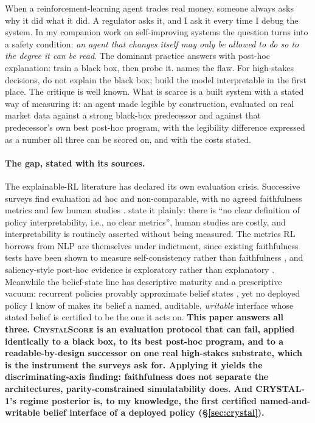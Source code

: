 \documentclass[11pt]{article}
\begin{document}
When a reinforcement-learning agent trades real money, someone always asks why it did what it
did. A regulator asks it, and I ask it every time I debug the system. In my companion work on
self-improving systems the question turns into a safety condition: \emph{an agent that changes
itself may only be allowed to do so to the degree it can be read}. The dominant practice answers
with post-hoc explanation: train a black box, then probe it. \citet{rudin2019} names the flaw.
For high-stakes decisions, do not explain the black box; build the model interpretable in the
first place. The critique is well known. What is scarce is a built system with a stated way of
measuring it: an agent made legible by construction, evaluated on real market data against a
strong black-box predecessor and against that predecessor's own best post-hoc program, with the
legibility difference expressed as a number all three can be scored on, and with the costs
stated.

\paragraph{The gap, stated with its sources.} The explainable-RL literature has declared its
own evaluation crisis. Successive surveys find evaluation ad hoc and non-comparable, with no
agreed faithfulness metrics and few human studies \citep{milani2024,vouros2023}.
\citet{kohler2025} state it plainly: there is ``no clear definition of policy
interpretability, i.e., no clear metrics'', human studies are costly, and interpretability is
routinely asserted without being measured. The metrics RL borrows from NLP are themselves under
indictment, since existing faithfulness tests have been shown to measure self-consistency rather
than faithfulness \citep{parcalabescu2024}, and saliency-style post-hoc evidence is exploratory
rather than explanatory \citep{atrey2020}. Meanwhile the belief-state line has descriptive
maturity and a prescriptive vacuum: recurrent policies provably approximate belief states
\citep{lambrechts2022}, yet no deployed policy I know of makes its belief a named, auditable,
\emph{writable} interface whose stated belief is certified to be the one it acts on.
\textbf{This paper answers all three. \textsc{CrystalScore} is an evaluation protocol that can
fail, applied identically to a black box, to its best post-hoc program, and to a
readable-by-design successor on one real high-stakes substrate, which is the instrument the
surveys ask for. Applying it yields the discriminating-axis finding: faithfulness does not
separate the architectures, parity-constrained simulatability does. And CRYSTAL-1's regime
posterior is, to my knowledge, the first certified named-and-writable belief interface of a
deployed policy (\S\ref{sec:crystal}).}
\end{document}
